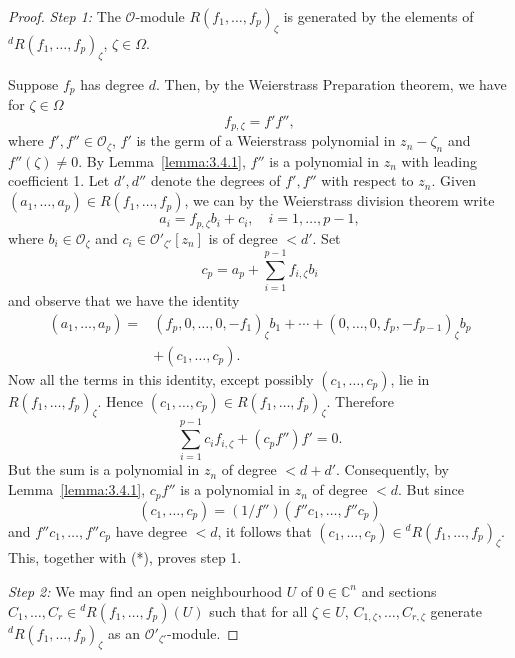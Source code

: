 \begin{proof}
\emph{Step 1:} The $\mathcal{O}$-module $R(f_1,\ldots,f_p)_\zeta$ is generated by the elements of ${}^d R(f_1,\ldots,f_p)_\zeta$, $\zeta\in\Omega$.

Suppose $f_p$ has degree $d$. Then, by the Weierstrass Preparation theorem, we have for $\zeta\in\Omega$
\[
f_{p,\zeta}=f'f'',
\]
where $f',f''\in\mathcal{O}_\zeta$, $f'$ is the germ of a Weierstrass polynomial in $z_n-\zeta_n$ and $f''(\zeta)\neq0$. By Lemma~\ref{lemma:3.4.1}, $f''$ is a polynomial in $z_n$ with leading coefficient 1. Let $d',d''$ denote the degrees of $f',f''$ with respect to $z_n$. Given $(a_1,\ldots,a_p)\in R(f_1,\ldots,f_p)$, we can by the Weierstrass division theorem write
\[
a_i=f_{p,\zeta}b_i+c_i,\quad i=1,\ldots,p-1,
\]
where $b_i\in\mathcal{O}_\zeta$ and $c_i\in\mathcal{O}'_{\zeta'}[z_n]$ is of degree $<d'$. Set
\[
c_p=a_p+\sum_{i=1}^{p-1}f_{i,\zeta}b_i
\]
and observe that we have the identity
\begin{equation*}
\begin{split}
(a_1,\ldots,a_p)={}&(f_p,0,\ldots,0,-f_1)_\zeta b_1+\cdots+(0,\ldots,0,f_p,-f_{p-1})_\zeta b_p\\
&+(c_1,\ldots,c_p).
\end{split}
\tag{*}\label{eq:7:star:1}
\end{equation*}
Now all the terms in this identity, except possibly $(c_1,\ldots,c_p)$, lie in $R(f_1,\ldots,f_p)_\zeta$. Hence $(c_1,\ldots,c_p)\in R(f_1,\ldots,f_p)_\zeta$. Therefore
\[
\sum_{i=1}^{p-1}c_if_{i,\zeta}+(c_pf'')f'=0.
\]
But the sum is a polynomial in $z_n$ of degree $<d+d'$. Consequently, by Lemma~\ref{lemma:3.4.1}, $c_pf''$ is a polynomial in $z_n$ of degree $<d$. But since
\[
(c_1,\ldots,c_p)=(1/f'')(f''c_1,\ldots,f''c_p)
\]
and $f''c_1,\ldots,f''c_p$ have degree $<d$, it follows that $(c_1,\ldots,c_p)\in{}^d R(f_1,\ldots,f_p)_\zeta$. This, together with (*), proves step 1.

\emph{Step 2:} We may find an open neighbourhood $U$ of $0\in\mathbb{C}^n$ and sections $C_1,\ldots,C_r\in{}^d R(f_1,\ldots,f_p)(U)$ such that for all $\zeta\in U$, $C_{1,\zeta},\ldots,C_{r,\zeta}$ generate ${}^d R(f_1,\ldots,f_p)_\zeta$ as an $\mathcal{O}'_{\zeta'}$-module.


\end{proof}
